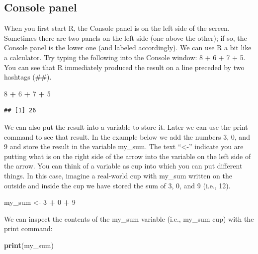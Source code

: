 \documentclass[
]{krantz}
\makeatletter
\newenvironment{Shaded}{\begin{snugshade}}{\end{snugshade}}
\newcommand{\DecValTok}[1]{\textcolor[rgb]{0.06,0.06,0.06}{#1}}
\newcommand{\KeywordTok}[1]{\textcolor[rgb]{0.27,0.27,0.27}{\textbf{#1}}}
\newcommand{\NormalTok}[1]{#1}
\newcommand{\OperatorTok}[1]{\textcolor[rgb]{0.43,0.43,0.43}{\textbf{#1}}}
\newcommand{\StringTok}[1]{\textcolor[rgb]{0.5,0.5,0.5}{#1}}
\newenvironment{kframe}{%
\medskip{}
\setlength{\fboxsep}{.8em}
 \def\at@end@of@kframe{}%
 \ifinner\ifhmode%
  \def\at@end@of@kframe{\end{minipage}}%
  \begin{minipage}{\columnwidth}%
 \fi\fi%
 \def\FrameCommand##1{\hskip\@totalleftmargin \hskip-\fboxsep
 \colorbox{shadecolor}{##1}\hskip-\fboxsep
     \hskip-\linewidth \hskip-\@totalleftmargin \hskip\columnwidth}%
 \MakeFramed {\advance\hsize-\width
   \@totalleftmargin\z@ \linewidth\hsize
   \@setminipage}}%
 {\par\unskip\endMakeFramed%
 \at@end@of@kframe}
\renewenvironment{Shaded}{\begin{kframe}}{\end{kframe}}
\makeatother
\begin{document}
\hypertarget{console-panel}{%
\subsection{Console panel}\label{console-panel}}

When you first start R, the Console panel is on the left side of the screen. Sometimes there are two panels on the left side (one above the other); if so, the Console panel is the lower one (and labeled accordingly). We can use R a bit like a calculator. Try typing the following into the Console window: 8 + 6 + 7 + 5. You can see that R immediately produced the result on a line preceded by two hashtags (\#\#).

\begin{Shaded}
\begin{Highlighting}[]
\DecValTok{8} \OperatorTok{+}\StringTok{ }\DecValTok{6} \OperatorTok{+}\StringTok{ }\DecValTok{7} \OperatorTok{+}\StringTok{ }\DecValTok{5}
\end{Highlighting}
\end{Shaded}

\begin{verbatim}
## [1] 26
\end{verbatim}

We can also put the result into a variable to store it. Later we can use the print command to see that result. In the example below we add the numbers 3, 0, and 9 and store the result in the variable my\_sum. The text ``\textless-'' indicate you are putting what is on the right side of the arrow into the variable on the left side of the arrow. You can think of a variable as cup into which you can put different things. In this case, imagine a real-world cup with my\_sum written on the outside and inside the cup we have stored the sum of 3, 0, and 9 (i.e., 12).

\begin{Shaded}
\begin{Highlighting}[]
\NormalTok{my_sum <-}\StringTok{ }\DecValTok{3} \OperatorTok{+}\StringTok{ }\DecValTok{0} \OperatorTok{+}\StringTok{ }\DecValTok{9}
\end{Highlighting}
\end{Shaded}

We can inspect the contents of the my\_sum variable (i.e., my\_sum cup) with the print command:

\begin{Shaded}
\begin{Highlighting}[]
\KeywordTok{print}\NormalTok{(my_sum)}
\end{Highlighting}
\end{Shaded}
\end{document}
